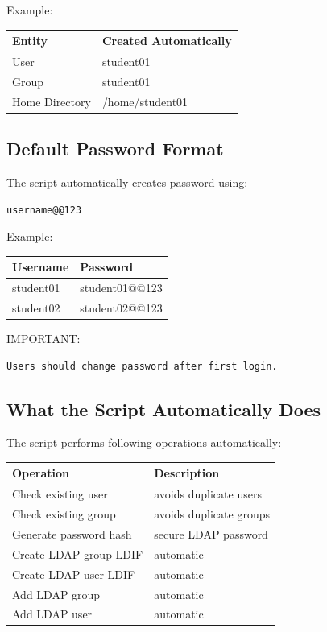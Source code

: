 \documentclass[11pt]{article}
\begin{document}
Example:

\begin{center}
\begin{tabular}{ll}
Entity & Created Automatically\\
\hline
User & student01\\
Group & student01\\
Home Directory & /home/student01\\
\end{tabular}
\end{center}
\subsection{Default Password Format}
\label{sec:org32a3696}

The script automatically creates password using:

\begin{verbatim}
username@@123
\end{verbatim}

Example:

\begin{center}
\begin{tabular}{ll}
Username & Password\\
\hline
student01 & student01@@123\\
student02 & student02@@123\\
\end{tabular}
\end{center}

IMPORTANT:

\begin{verbatim}
Users should change password after first login.
\end{verbatim}
\subsection{What the Script Automatically Does}
\label{sec:orgb016872}

The script performs following operations automatically:

\begin{center}
\begin{tabular}{ll}
Operation & Description\\
\hline
Check existing user & avoids duplicate users\\
Check existing group & avoids duplicate groups\\
Generate password hash & secure LDAP password\\
Create LDAP group LDIF & automatic\\
Create LDAP user LDIF & automatic\\
Add LDAP group & automatic\\
Add LDAP user & automatic\\
\end{tabular}
\end{center}
\end{document}
